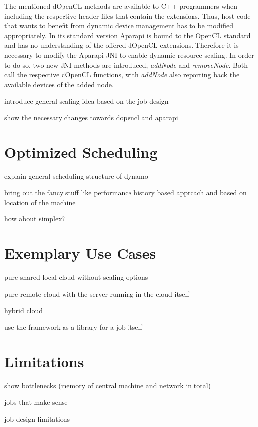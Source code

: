 The mentioned dOpenCL methods are available to C++ programmers when including the respective header files that contain the extensions. Thus, host code that wants to benefit from dynamic device management has to be modified appropriately. In its standard version Aparapi is bound to the OpenCL standard and has no understanding of the offered dOpenCL extensions. Therefore it is necessary to modify the Aparapi JNI to enable dynamic resource scaling. In order to do so, two new JNI methods are introduced, \textit{addNode} and \textit{removeNode}. Both call the respective dOpenCL functions, with \textit{addNode} also reporting back the available devices of the added node.

introduce general scaling idea based on the job design

show the necessary changes towards dopencl and aparapi

\section{Optimized Scheduling}



explain general scheduling structure of dynamo

bring out the fancy stuff like performance history based approach and based on location of the machine

how about simplex?

\section{Exemplary Use Cases}



pure shared local cloud without scaling options

pure remote cloud with the server running in the cloud itself

hybrid cloud

use the framework as a library for a job itself
\section{Limitations}

show bottlenecks (memory of central machine and network in total)

jobs that make sense

job design limitations

